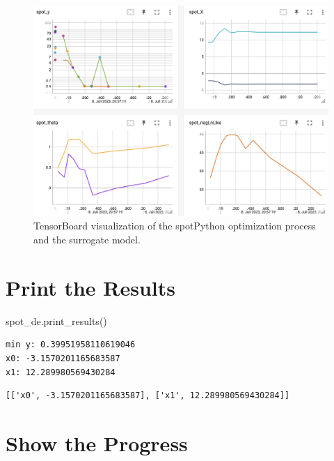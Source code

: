 \documentclass[
  letterpaper,
  DIV=11,
  numbers=noendperiod]{scrreprt}
\newenvironment{Shaded}{\begin{snugshade}}{\end{snugshade}}
\newcommand{\NormalTok}[1]{\textcolor[rgb]{0.00,0.23,0.31}{#1}}
\begin{document}
\begin{figure}

{\centering \includegraphics[width=1\textwidth,height=\textheight]{figures_static/05_tensorboard_01.png}

}

\caption{TensorBoard visualization of the spotPython optimization
process and the surrogate model.}

\end{figure}

\hypertarget{print-the-results-2}{%
\section{Print the Results}\label{print-the-results-2}}

\begin{Shaded}
\begin{Highlighting}[]
\NormalTok{spot\_de.print\_results()}
\end{Highlighting}
\end{Shaded}

\begin{verbatim}
min y: 0.39951958110619046
x0: -3.1570201165683587
x1: 12.289980569430284
\end{verbatim}

\begin{verbatim}
[['x0', -3.1570201165683587], ['x1', 12.289980569430284]]
\end{verbatim}

\hypertarget{show-the-progress-1}{%
\section{Show the Progress}\label{show-the-progress-1}}
\end{document}
